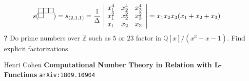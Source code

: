 \documentclass[12pt]{article}
\begin{document}
$$ s({\begin{tikzpicture}[scale=0.25] 
\draw(0,0)--(1,0)--(1,1)--(0,1)--cycle;
\draw(1,0)--(2,0)--(2,1)--(1,1)--cycle;
\draw(2,0)--(3,0)--(3,1)--(2,1)--cycle;
\draw(0,0)--(1,0)--(1,-1)--(0,-1)--cycle;\end{tikzpicture}}) = s_{(2,1,1)} = \frac{1}{\Delta}
 \left| \begin{array}{ccc}   x_1^4 & x_2^4 & x_3^4 \\ x_1^2 & x_2^2 & x_3^2 \\ x_1 & x_2 & x_3 \end{array} \right| =  x_1 x_2 x_3(x_1 + x_2 + x_3) $$
\textbf{?} Do prime numbers over $\mathbb{Z}$ such as $5$ or $23$ factor in $\mathbb{Q}[x]/(x^3 - x - 1)$.  Find explicit factorizations.
\vfill
\begin{thebibliography}{} 

\item Henri Cohen \textbf{Computational Number Theory in Relation with L-Functions} \texttt{arXiv:1809.10904}

\end{thebibliography}
\end{document}
